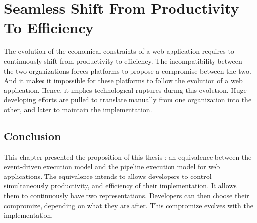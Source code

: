 \chapter{Seamless Shift From Productivity To Efficiency} \label{chapter4}
\minitoc
\eject

The evolution of the economical constraints of a web application requires to continuously shift from productivity to efficiency.
The incompatibility between the two organizations forces platforms to propose a compromise between the two.
And it makes it impossible for these platforms to follow the evolution of a web application.
Hence, it implies technological ruptures during this evolution.
Huge developing efforts are pulled to translate manually from one organization into the other, and later to maintain the implementation. %









\section{Conclusion}

This chapter presented the proposition of this thesis : an equivalence between the event-driven execution model and the pipeline execution model for web applications.
The equivalence intends to allows developers to control simultaneously productivity, and efficiency of their implementation.
It allows them to continuously have two representations.
Developers can then choose their compromize, depending on what they are after.
This compromize evolves with the implementation.

